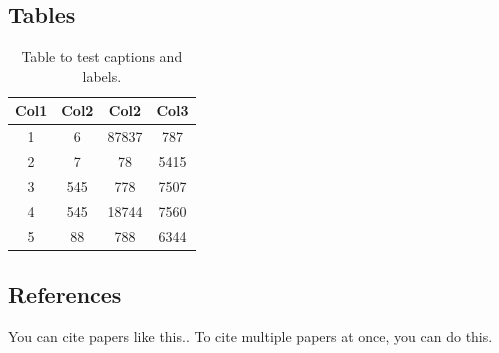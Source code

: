 \documentclass[
]
{thepaper}
\begin{document}
\subsection{Tables}

\begin{table}[h!]
    \centering
    \begin{tabular}{c c c c} 
     \hline
     Col1 & Col2 & Col2 & Col3 \\ 
     \hline
     1 & 6 & 87837 & 787 \\ 
     2 & 7 & 78 & 5415 \\
     3 & 545 & 778 & 7507 \\
     4 & 545 & 18744 & 7560 \\
     5 & 88 & 788 & 6344 \\
     \hline
    \end{tabular}
    \caption{Table to test captions and labels.}
    \label{table:1}
\end{table}

\subsection{References}
You can cite papers like this.\cite{neese2018}. To cite multiple papers at once, you can do this.\cite{neese2018,example2}



\end{document}
